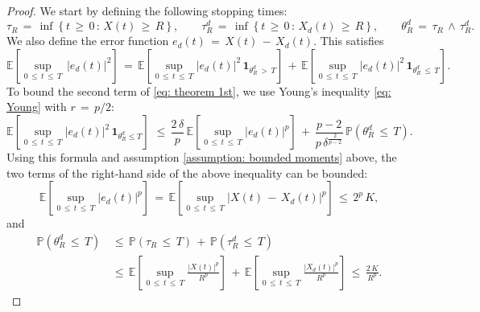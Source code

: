 \begin{proof}
    We start by defining the following stopping times:
    $$
    {\tau}_R\,=\,\inf\left\{t\, {\geq} \,0\,:\,X(t)\, {\geq} \,R\right\}, \quad \quad
    {\tau}_R^d\,=\, \inf\left\{t\, {\geq} \,0\,:\,X_d(t)\, {\geq} \,R\right\}, \quad \quad
    {\theta}_R^d\,=\, {\tau}_R\,{\wedge}\,{\tau}_R^d.
    $$
    We also define the error function $e_d(t)\,=\,X(t)\,-\,X_d(t)$. This satisfies
    \begin{equation}
        \mathbb E \left[\sup_{0\, {\leq} \,t\, {\leq} \,T}\,|e_d(t)|^2 \right]\, = \,\mathbb E
        \left[\sup_{0\, {\leq} \,t\, {\leq} \,T} |e_d(t)|^2 \,\mathbf 1_{{\theta}_R^d\,>\,T} \right] \,+\,
        \mathbb E \left[\sup_{0\, {\leq} \,t\, {\leq} \,T} |e_d(t)|^2 \, \mathbf 1_{{\theta}_R^d\, {\leq} \,T} \right].
        \label{eq: theorem 1st}        
    \end{equation}
    To bound the second term of \eqref{eq: theorem 1st}, we use Young's
    inequality \eqref{eq: Young} with $r \,=\, p/2$:
    \begin{equation}
        \mathbb E \left[\sup_{0\, {\leq} \,t\, {\leq} \,T} |e_d(t)|^2 \, \mathbf 1_{{\theta}_R^d  {\leq} T} \right]\,
        \, {\leq} \,\frac{2\,{\delta}}{p}\,\mathbb E \left[\sup_{0\, {\leq} \,t\, {\leq} \,T} |e_d(t)|^p\right]
        \,+\,\frac{p-2}{p\,{\delta}^{\frac{2}{p-2}}}\,\mathbb P({\theta}_R^d\, {\leq} \,T).
        \label{eq:auxEq1}
    \end{equation}
    Using this formula and assumption \ref{assumption: bounded moments} above,
    the two terms of the right-hand side of the above inequality can be bounded:
    \begin{equation}
        \mathbb E \left[\sup_{0\, {\leq} \,t\, {\leq} \,T} |e_d(t)|^p\right]\,=\,\mathbb E
        \left[\sup_{0\, {\leq} \,t\, {\leq} \,T} |X(t)\,-\,X_d(t)|^p\right]
        \, {\leq} \,2^{p}\,K,
        \label{eq:auxIneq1}
    \end{equation}
    and 
    \begin{equation}
        \begin{aligned}
            \mathbb P({\theta}_R^d\, {\leq} \,T)\,& {\leq} \,\mathbb P({\tau}_R \, {\leq} \,T) \,+\,\mathbb P({\tau}_R^d\, {\leq} \,T) \\
            & {\leq} \,\mathbb E \left[\sup_{0\, {\leq} \,t\, {\leq} \,T} \frac{|X(t)|^p}{R^p}\right] \,+\,
            \mathbb E \left[\sup_{0\, {\leq} \,t\, {\leq} \,T} \frac{|X_d(t)|^p}{R^p}\right]
            \, {\leq} \, \frac{2\,K}{R^p}. 
        \end{aligned}

\end{equation}
\end{proof}
